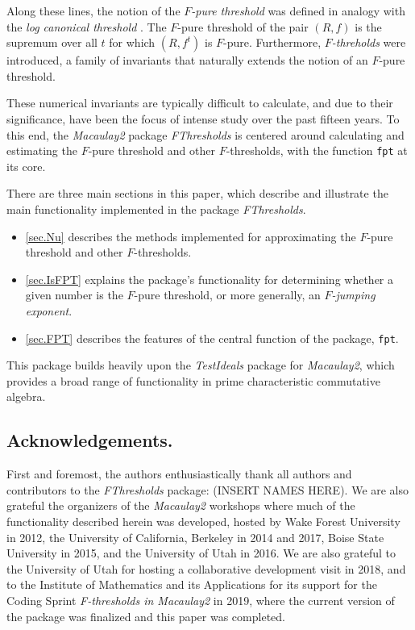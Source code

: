 \documentclass{amsart}
\begin{document}
Along these lines, the notion of the \emph{$F$-pure threshold} was defined in analogy with the \emph{log canonical threshold} \cite{TakagiWatanabeFPureThresh,MustataTakagiWatanabeFThresholdsAndBernsteinSato}.
The $F$-pure threshold of the pair $(R, f)$ is the supremum over all $t$ for which $(R, f^t)$ is $F$-pure.
Furthermore, \emph{$F$-threholds} were introduced, a family of invariants that naturally extends the notion of an $F$-pure threshold.

These numerical invariants are typically difficult to calculate,
and due to their significance, have been the focus of intense study over the past fifteen years.
To this end, the \emph{Macaulay2} package \emph{FThresholds} is centered around calculating and estimating the $F$-pure threshold and other $F$-thresholds, with the function {\tt fpt} at its core.


There are three main sections in this paper, which describe and illustrate the main functionality implemented in the package \emph{FThresholds}.
\begin{itemize}
\item \autoref{sec.Nu} describes the methods implemented for approximating the $F$-pure threshold and other $F$-thresholds.
\item \autoref{sec.IsFPT} explains the package's functionality for determining whether a given number is the $F$-pure threshold, or more generally, an \emph{$F$-jumping exponent}.
\item \autoref{sec.FPT} describes the features of the central function of the package, {\tt fpt}.
\end{itemize}

This package builds heavily upon the \emph{TestIdeals} package for \emph{Macaulay2}, which provides a broad range of functionality in prime characteristic commutative algebra.

\subsection*{Acknowledgements.}  First and foremost, the authors enthusiastically thank all authors and contributors to the \emph{FThresholds} package: (INSERT NAMES HERE). %
We are also grateful the organizers of the \emph{Macaulay2} workshops where much of the functionality described herein was developed, hosted by Wake Forest University in 2012, the University of California, Berkeley in 2014 and 2017, Boise State University in 2015, and the University of Utah in 2016.
We are also grateful to the University of Utah for hosting a collaborative development visit in 2018, and to the Institute of Mathematics and its Applications for its support for the Coding Sprint \emph{F-thresholds in Macaulay2} in 2019, where the current version of the package was finalized and this paper was completed.
\end{document}
